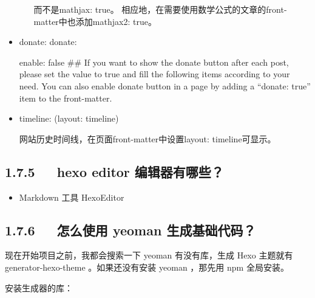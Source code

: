 \documentclass[letterpaper,12pt,english]{sphinxmanual}
\begin{document}
\begin{itemize}
\begin{enumerate}
而不是mathjax: true。      相应地，在需要使用数学公式的文章的front-matter中也添加mathjax2: true。

\end{enumerate}

\item {} 
donate: donate:

enable: false \#\# If you want to show the donate button after each post, please set the value to true and fill the following items according to your need. You can also enable donate button in a page by adding a “donate: true” item to the front-matter.

\item {} 
timeline: (layout: timeline)

网站历史时间线，在页面front-matter中设置layout: timeline可显示。

\end{itemize}


\subsection{1.7.5   hexo editor 编辑器有哪些？}
\label{\detokenize{001software/001install/001._u7f51_u7ad9/hexo:hexo-editor}}\begin{itemize}
\item {} 
Markdown 工具 HexoEditor



\end{itemize}


\subsection{1.7.6   怎么使用 yeoman 生成基础代码？}
\label{\detokenize{001software/001install/001._u7f51_u7ad9/hexo:yeoman}}
现在开始项目之前，我都会搜索一下 yeoman 有没有库，生成 Hexo 主题就有 generator-hexo-theme 。如果还没有安装 yeoman ，那先用 npm 全局安装。

\begin{sphinxVerbatim}[commandchars=\\\{\}]
   
\end{sphinxVerbatim}

安装生成器的库：

\begin{sphinxVerbatim}[commandchars=\\\{\}]
   
\end{sphinxVerbatim}
\end{document}
